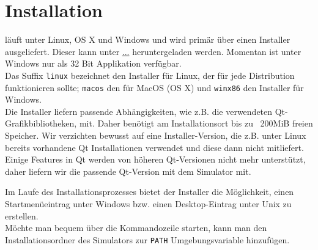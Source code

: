 
\section{Installation}

\erasim läuft unter Linux, OS X und Windows und wird primär über einen Installer ausgeliefert. Dieser kann unter \url{...} heruntergeladen werden. Momentan ist \erasim unter Windows nur als 32 Bit Applikation verfügbar.\\
Das Suffix \texttt{linux} bezeichnet den Installer für Linux, der für jede Distribution funktionieren sollte; \texttt{macos} den für MacOS (OS X) und \texttt{winx86} den Installer für Windows.\\
Die Installer liefern passende Abhängigkeiten, wie z.B. die verwendeten Qt-Grafikbibliotheken, mit. Daher benötigt \erasim am Installationsort bis zu ~200MiB freien Speicher. Wir verzichten bewusst auf eine Installer-Version, die z.B. unter Linux bereits vorhandene Qt Installationen verwendet und diese dann nicht mitliefert. Einige Features in Qt werden von höheren Qt-Versionen nicht mehr unterstützt, daher liefern wir die passende Qt-Version mit dem Simulator mit.

Im Laufe des Installationsprozesses bietet der Installer die Möglichkeit, einen Startmenüeintrag unter Windows bzw. einen Desktop-Eintrag unter Unix zu erstellen.\\
Möchte man \erasim bequem über die Kommandozeile starten, kann man den Installationsordner des Simulators zur \texttt{PATH} Umgebungsvariable hinzufügen.